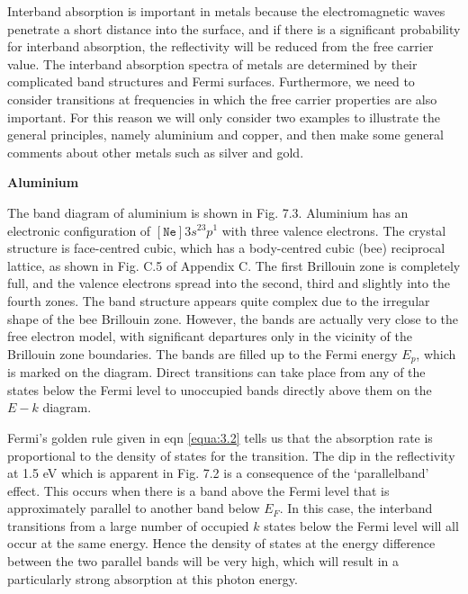 \documentclass[12pt]{book}
\begin{document}
Interband absorption is important in metals because the electromagnetic waves penetrate a short distance into the surface, and if there is a significant probability for interband absorption, the reflectivity will be reduced from the free carrier value. The interband absorption spectra of metals are determined by their complicated band structures and Fermi surfaces. Furthermore, we need to consider transitions at frequencies in which the free carrier properties are also important. For this reason we will only consider two examples to illustrate the general principles, namely aluminium and copper, and then make some general comments about other metals such as silver and gold.

\textbf{Aluminium}

The band diagram of aluminium is shown in Fig. 7.3. Aluminium has an electronic configuration of $[\mathtt{Ne}]3s^23p^1$ with three valence electrons. The crystal structure is face-centred cubic, which has a body-centred cubic (bee) reciprocal lattice, as shown in Fig. C.5 of Appendix C. The first Brillouin zone is completely full, and the valence electrons spread into the second, third and slightly into the fourth zones. The band structure appears quite complex due to the irregular shape of the bee Brillouin zone. However, the bands are actually very close to the free electron model, with significant departures only in the vicinity of the Brillouin zone boundaries. The bands are filled up to the Fermi energy $E_p$, which is marked on the diagram. Direct transitions can take place from any of the states below the Fermi level to unoccupied bands directly above them on the $E-k$ diagram.

Fermi's golden rule given in eqn \ref{equa:3.2} tells us that the absorption rate is proportional to the density of states for the transition. The dip in the reflectivity at 1.5 eV which is apparent in Fig. 7.2 is a consequence of the `parallelband' effect. This occurs when there is a band above the Fermi level that is approximately parallel to another band below $E_F$. In this case, the interband transitions from a large number of occupied $k$ states below the Fermi level will all occur at the same energy. Hence the density of states at the energy difference between the two parallel bands will be very high, which will result in a particularly strong absorption at this photon energy.
\end{document}
